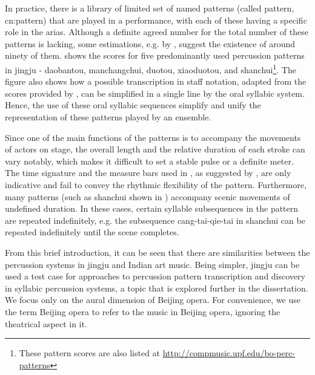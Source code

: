 In practice, there is a library of limited set of named patterns (called \gls{pattern}, \gls{cn:pattern}) that are played in a performance, with each of these having a specific role in the arias. Although a definite agreed number for the total number of these patterns is lacking, some estimations, e.g. by , suggest the existence of around ninety of them.  shows the scores for five predominantly used percussion patterns in \gls{jingju} - \gls{daobantou}, \gls{manchangchui}, \gls{duotou}, \gls{xiaoduotou}, and \gls{shanchui}\footnote{These pattern scores are also listed at \url{http://compmusic.upf.edu/bo-perc-patterns}}. The figure also shows how a possible transcription in staff notation, adapted from the scores provided by , can be simplified in a single line by the oral syllabic system. Hence, the use of these oral syllabic sequences simplify and unify the representation of these patterns played by an ensemble. 

Since one of the main functions of the patterns is to accompany the movements of actors on stage, the overall length and the relative duration of each stroke can vary notably, which makes it difficult to set a stable pulse or a definite meter. The time signature and the measure bars used in , as suggested by , are only indicative and fail to convey the rhythmic flexibility of the pattern. Furthermore, many patterns (such as \gls{shanchui} shown in ) accompany scenic movements of undefined duration. In these cases, certain syllable subsequences in the pattern are repeated indefinitely, e.g. the subsequence \gls{cang}-\gls{tai}-\gls{qie}-\gls{tai} in \gls{shanchui} can be repeated indefinitely until the scene completes.  

From this brief introduction, it can be seen that there are similarities between the percussion systems in \gls{jingju} and Indian art music. Being simpler, \gls{jingju} can be used a test case for approaches to percussion pattern transcription and discovery in syllabic percussion systems, a topic that is explored further in the dissertation. We focus only on the aural dimension of Beijing opera. For convenience, we use the term Beijing opera to refer to the music in Beijing opera, ignoring the theatrical aspect in it.  
%
